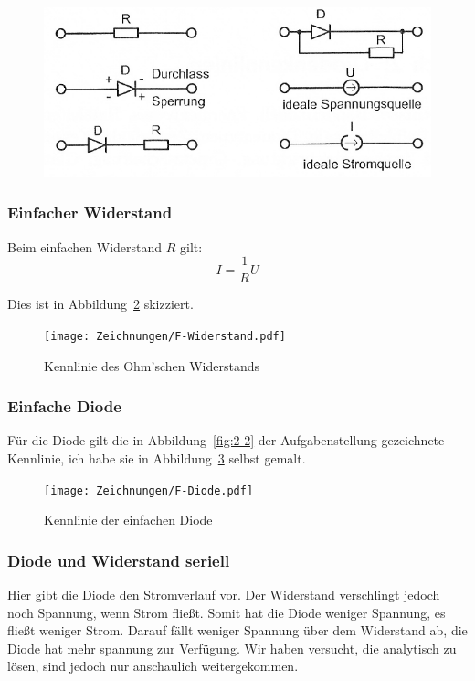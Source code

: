 \begin{figure}[h]
	\centering
	\caption{%
		\cite[Abbildung~2.3]{physik313-Anleitung}
	}
	\label{fig:2-3}
	\includegraphics[width=.6\linewidth]{Bilder_aus_Anleitung/2-3.png}
\end{figure}

\subsubsection{Einfacher Widerstand}

Beim einfachen Widerstand $R$ gilt:
\[
	I = \frac 1R U
\]

Dies ist in Abbildung~\ref{fig:F-Widerstand} skizziert.

\begin{figure}[h]
	\centering
	\caption{%
		Kennlinie des Ohm'schen Widerstands
	}
	\label{fig:F-Widerstand}
	\texttt{[image: Zeichnungen/F-Widerstand.pdf]}
\end{figure}

\subsubsection{Einfache Diode}

Für die Diode gilt die in Abbildung~\ref{fig:2-2} der Aufgabenstellung gezeichnete
Kennlinie, ich habe sie in Abbildung~\ref{fig:F-Diode} selbst gemalt.

\begin{figure}[h]
	\centering
	\caption{%
		Kennlinie der einfachen Diode
	}
	\label{fig:F-Diode}
	\texttt{[image: Zeichnungen/F-Diode.pdf]}
\end{figure}

\subsubsection{Diode und Widerstand seriell}

Hier gibt die Diode den Stromverlauf vor. Der Widerstand verschlingt jedoch
noch Spannung, wenn Strom fließt. Somit hat die Diode weniger Spannung, es
fließt weniger Strom. Darauf fällt weniger Spannung über dem Widerstand ab, die
Diode hat mehr spannung zur Verfügung. Wir haben versucht, die analytisch zu
lösen, sind jedoch nur anschaulich weitergekommen.

